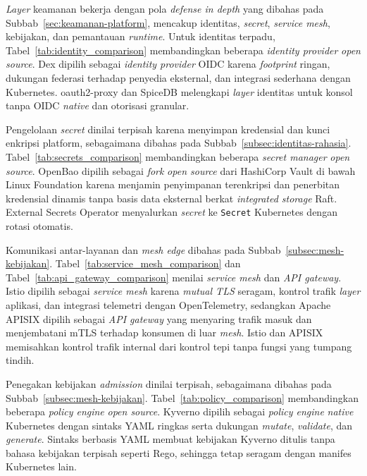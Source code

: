 \textit{Layer} keamanan bekerja dengan pola \textit{defense in depth} yang dibahas pada Subbab~\ref{sec:keamanan-platform}, mencakup identitas, \textit{secret}, \textit{service mesh}, kebijakan, dan pemantauan \textit{runtime}. Untuk identitas terpadu, Tabel~\ref{tab:identity_comparison} membandingkan beberapa \textit{identity provider} \textit{open source}. Dex dipilih sebagai \textit{identity provider} OIDC karena \textit{footprint} ringan, dukungan federasi terhadap penyedia eksternal, dan integrasi sederhana dengan Kubernetes. oauth2-proxy dan SpiceDB melengkapi \textit{layer} identitas untuk konsol tanpa OIDC \textit{native} dan otorisasi granular.



Pengelolaan \textit{secret} dinilai terpisah karena menyimpan kredensial dan kunci enkripsi platform, sebagaimana dibahas pada Subbab~\ref{subsec:identitas-rahasia}. Tabel~\ref{tab:secrets_comparison} membandingkan beberapa \textit{secret manager} \textit{open source}. OpenBao dipilih sebagai \textit{fork} \textit{open source} dari HashiCorp Vault di bawah Linux Foundation karena menjamin penyimpanan terenkripsi dan penerbitan kredensial dinamis tanpa basis data eksternal berkat \textit{integrated storage} Raft. External Secrets Operator menyalurkan \textit{secret} ke \texttt{Secret} Kubernetes dengan rotasi otomatis.



Komunikasi antar-layanan dan \textit{mesh edge} dibahas pada Subbab~\ref{subsec:mesh-kebijakan}. Tabel~\ref{tab:service_mesh_comparison} dan Tabel~\ref{tab:api_gateway_comparison} menilai \textit{service mesh} dan \textit{API gateway}. Istio dipilih sebagai \textit{service mesh} karena \textit{mutual TLS} seragam, kontrol trafik \textit{layer} aplikasi, dan integrasi telemetri dengan OpenTelemetry, sedangkan Apache APISIX dipilih sebagai \textit{API gateway} yang menyaring trafik masuk dan menjembatani mTLS terhadap konsumen di luar \textit{mesh}. Istio dan APISIX memisahkan kontrol trafik internal dari kontrol tepi tanpa fungsi yang tumpang tindih.





Penegakan kebijakan \textit{admission} dinilai terpisah, sebagaimana dibahas pada Subbab~\ref{subsec:mesh-kebijakan}. Tabel~\ref{tab:policy_comparison} membandingkan beberapa \textit{policy engine} \textit{open source}. Kyverno dipilih sebagai \textit{policy engine} \textit{native} Kubernetes dengan sintaks YAML ringkas serta dukungan \textit{mutate}, \textit{validate}, dan \textit{generate}. Sintaks berbasis YAML membuat kebijakan Kyverno ditulis tanpa bahasa kebijakan terpisah seperti Rego, sehingga tetap seragam dengan manifes Kubernetes lain.

